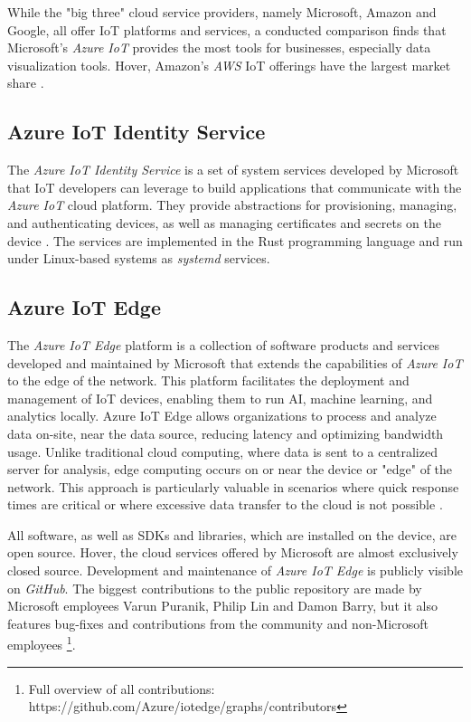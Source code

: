 While the "big three" cloud service providers, namely Microsoft, Amazon and
Google, all offer \ac{IoT} platforms and services, a conducted comparison finds
that Microsoft's \textit{Azure IoT} provides the most tools for businesses,
especially data visualization tools. Hover, Amazon's \textit{AWS} \ac{IoT}
offerings have the largest market share \cite{9116254}.

\subsection{Azure IoT Identity Service}
The \textit{Azure IoT Identity Service} is a set of system services developed
by Microsoft that \ac{IoT} developers can leverage to build applications that
communicate with the \textit{Azure IoT} cloud platform. They provide abstractions
for provisioning, managing, and authenticating devices, as well as managing
certificates and secrets on the device \cite{aiiot}. The services are implemented
in the Rust programming language and run under Linux-based systems as \textit{systemd}
services.


\subsection{Azure IoT Edge}
The \textit{Azure IoT Edge} platform is a collection of software products and
services developed and maintained by Microsoft that extends the capabilities
of \textit{Azure IoT} to the edge of the network. This platform facilitates the
deployment and management of \ac{IoT} devices, enabling them to run \ac{AI},
machine learning, and analytics locally. Azure IoT Edge allows organizations to
process and analyze data on-site, near the data source, reducing latency and
optimizing bandwidth usage.
Unlike traditional cloud computing, where data is sent to a centralized server
for analysis, edge computing occurs on or near the device or "edge" of the
network. This approach is particularly valuable in scenarios where quick
response times are critical or where excessive data transfer to the cloud
is not possible \cite{msdoc-aziotedge}.

All software, as well as \ac{SDK}s and
libraries, which are installed on the device, are open source. Hover, the
cloud services offered by Microsoft are almost exclusively closed source.
Development and maintenance of \textit{Azure IoT Edge} is publicly visible on
\textit{GitHub}. The biggest contributions
to the public repository are made by Microsoft employees Varun Puranik,
Philip Lin and Damon Barry, but it also features bug-fixes and contributions
from the community and non-Microsoft employees
\footnote{Full overview of all contributions: https://github.com/Azure/iotedge/graphs/contributors}.


